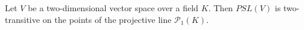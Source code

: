 Let $V$ be a two-dimensional vector space over a field $K$. Then $PSL(V)$ is two-transitive on the points of the projective line $\mathcal{P}_1(K)$.
